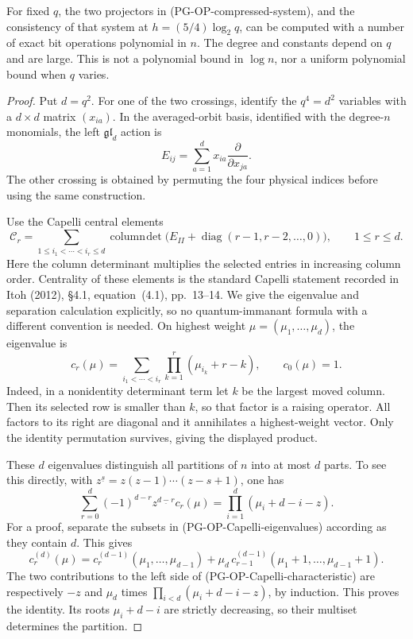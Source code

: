 \begin{proposition}
\label{pg:op-capelli}
For fixed $q$, the two projectors in (PG-OP-compressed-system), and the
consistency of that system at $h=(5/4)\log_2q$, can be computed with a
number of exact bit operations polynomial in $n$. The degree and
constants depend on $q$ and are large. This is not a polynomial bound in
$\log n$, nor a uniform polynomial bound when $q$ varies.
\end{proposition}
\begin{proof}
Put $d=q^2$. For one of the two crossings, identify the $q^4=d^2$
variables with a $d\times d$ matrix $(x_{ia})$. In the averaged-orbit
basis, identified with the degree-$n$ monomials, the left
$\mathfrak{gl}_d$ action is
\[
 E_{ij}=\sum_{a=1}^d x_{ia}\frac{\partial}{\partial x_{ja}}.
 \tag{PG-OP-differential}
\]
The other crossing is obtained by permuting the four physical indices
before using the same construction.

Use the Capelli central elements
\[
 \mathcal C_r=
 \sum_{1\leq i_1<\cdots<i_r\leq d}
 \operatorname{column\!\det}
 \bigl(E_{II}+\operatorname{diag}(r-1,r-2,\ldots,0)\bigr),
 \qquad 1\leq r\leq d.
 \tag{PG-OP-Capelli}
\]
Here the column determinant multiplies the selected entries in increasing
column order. Centrality of these elements is the standard Capelli
statement recorded in Itoh (2012), \S4.1, equation~(4.1), pp.~13--14.
We give the eigenvalue and separation calculation explicitly, so no
quantum-immanant formula with a different convention is needed.
On highest weight $\mu=(\mu_1,\ldots,\mu_d)$, the eigenvalue is
\[
 c_r(\mu)=\sum_{i_1<\cdots<i_r}
                    \prod_{k=1}^r(\mu_{i_k}+r-k),\qquad c_0(\mu)=1.
 \tag{PG-OP-Capelli-eigenvalues}
\]
Indeed, in a nonidentity determinant term let $k$ be the largest moved
column. Then its selected row is smaller than $k$, so that factor is a
raising operator. All factors to its right are diagonal and it
annihilates a highest-weight vector. Only the identity permutation
survives, giving the displayed product.

These $d$ eigenvalues distinguish all partitions of $n$ into at most
$d$ parts. To see this directly, with
$z^{\underline s}=z(z-1)\cdots(z-s+1)$, one has
\[
 \sum_{r=0}^d(-1)^{d-r}z^{\underline{d-r}}c_r(\mu)
       =\prod_{i=1}^d(\mu_i+d-i-z).
 \tag{PG-OP-Capelli-characteristic}
\]
For a proof, separate the subsets in (PG-OP-Capelli-eigenvalues)
according as they contain $d$. This gives
\[
 c_r^{(d)}(\mu)=c_r^{(d-1)}(\mu_1,\ldots,\mu_{d-1})
       +\mu_d\,c_{r-1}^{(d-1)}(\mu_1+1,\ldots,\mu_{d-1}+1).
\]
The two contributions to the left side of
(PG-OP-Capelli-characteristic) are respectively $-z$ and $\mu_d$
times $\prod_{i<d}(\mu_i+d-i-z)$, by induction. This proves the
identity. Its roots $\mu_i+d-i$ are strictly decreasing, so their
multiset determines the partition.


\end{proof}
